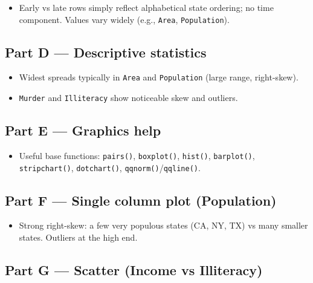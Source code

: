 \documentclass[
  letterpaper,
  DIV=11,
  numbers=noendperiod]{scrreprt}
\providecommand{\tightlist}{%
  \setlength{\itemsep}{0pt}\setlength{\parskip}{0pt}}
\begin{document}
\begin{itemize}
\tightlist
\item
  Early vs late rows simply reflect alphabetical state ordering; no time
  component. Values vary widely (e.g., \texttt{Area},
  \texttt{Population}).
\end{itemize}

\subsection{Part D --- Descriptive
statistics}\label{part-d-descriptive-statistics-1}

\begin{itemize}
\tightlist
\item
  Widest spreads typically in \texttt{Area} and \texttt{Population}
  (large range, right-skew).\\
\item
  \texttt{Murder} and \texttt{Illiteracy} show noticeable skew and
  outliers.
\end{itemize}

\subsection{Part E --- Graphics help}\label{part-e-graphics-help}

\begin{itemize}
\tightlist
\item
  Useful base functions: \texttt{pairs()}, \texttt{boxplot()},
  \texttt{hist()}, \texttt{barplot()}, \texttt{stripchart()},
  \texttt{dotchart()}, \texttt{qqnorm()}/\texttt{qqline()}.
\end{itemize}

\subsection{Part F --- Single column plot
(Population)}\label{part-f-single-column-plot-population}

\begin{itemize}
\tightlist
\item
  Strong right-skew: a few very populous states (CA, NY, TX) vs many
  smaller states. Outliers at the high end.
\end{itemize}

\subsection{Part G --- Scatter (Income vs
Illiteracy)}\label{part-g-scatter-income-vs-illiteracy}
\end{document}
